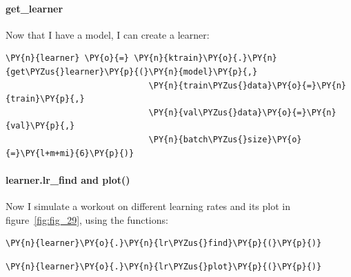 \paragraph{get\_learner}
Now that I have a model, I can create a learner:
    \begin{tcolorbox}[breakable, size=fbox, boxrule=1pt, pad at break*=1mm,colback=cellbackground, colframe=cellborder]
\begin{Verbatim}[commandchars=\\\{\},fontsize=\footnotesize]
\PY{n}{learner} \PY{o}{=} \PY{n}{ktrain}\PY{o}{.}\PY{n}{get\PYZus{}learner}\PY{p}{(}\PY{n}{model}\PY{p}{,}
                             \PY{n}{train\PYZus{}data}\PY{o}{=}\PY{n}{train}\PY{p}{,} 
                             \PY{n}{val\PYZus{}data}\PY{o}{=}\PY{n}{val}\PY{p}{,} 
                             \PY{n}{batch\PYZus{}size}\PY{o}{=}\PY{l+m+mi}{6}\PY{p}{)}
\end{Verbatim}
\end{tcolorbox}

\paragraph{learner.lr\_find and plot()}
Now I simulate a workout on different learning rates and its \gls{plot} in figure~\ref{fig:fig_29}, using the functions:
    \begin{tcolorbox}[breakable, size=fbox, boxrule=1pt, pad at break*=1mm,colback=cellbackground, colframe=cellborder]
\begin{Verbatim}[commandchars=\\\{\},fontsize=\footnotesize]
\PY{n}{learner}\PY{o}{.}\PY{n}{lr\PYZus{}find}\PY{p}{(}\PY{p}{)}
\end{Verbatim}
\end{tcolorbox}

\begin{tcolorbox}[breakable, size=fbox, boxrule=1pt, pad at break*=1mm,colback=cellbackground, colframe=cellborder]
\begin{Verbatim}[commandchars=\\\{\},fontsize=\footnotesize]
\PY{n}{learner}\PY{o}{.}\PY{n}{lr\PYZus{}plot}\PY{p}{(}\PY{p}{)}
\end{Verbatim}
\end{tcolorbox}

